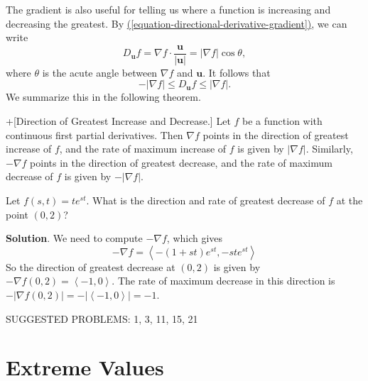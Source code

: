 \documentclass[10pt,]{book}
\theoremstyle{ptxplainnotitle}
\theoremstyle{ptxplaintitle}
\theoremstyle{ptxplainnotitle}
\theoremstyle{ptxplaintitle}
\theoremstyle{ptxplainnotitle}
\theoremstyle{ptxplaintitle}
\theoremstyle{ptxdefinitionnotitle}
\theoremstyle{ptxdefinitiontitle}
\theoremstyle{ptxdefinitionnotitle}
\theoremstyle{ptxdefinitiontitle}
\theoremstyle{ptxdefinitionnotitle}
\theoremstyle{ptxdefinitiontitle}
\theoremstyle{ptxdefinitionnotitle}
\theoremstyle{ptxdefinitiontitle}
\theoremstyle{ptxdefinitionnotitle}
\theoremstyle{ptxdefinitiontitle}
\numberwithin{equation}{section}
\newcommand{\vv}[1]{\mathbf{#1}}
\newcommand{\grad}{\nabla}
\newcommand{\dotprod}[1]{\left\langle #1 \right\rangle}
\begin{document}
\hypertarget{p-1068}{}%
The gradient is also useful for telling us where a function is increasing and decreasing the greatest. By \hyperref[equation-directional-derivative-gradient]{(\ref{equation-directional-derivative-gradient})}, we can write%
\begin{equation*}
D_{\vv{u}}f = \grad f\cdot\frac{\vv{u}}{|\vv{u}|} = |\grad f| \cos\theta,
\end{equation*}
where \(\theta\) is the acute angle between \(\grad f\) and \(\vv{u}\). It follows that%
\begin{equation*}
-|\grad f| \leq D_{\vv{u}}f \leq |\grad f|.
\end{equation*}
We summarize this in the following theorem.%
\begin{theorem}+[{Direction of Greatest Increase and Decrease.}]\label{theorem-direction-of-greatest-increase-and-decrease}
\hypertarget{p-1069}{}%
Let \(f\) be a function with continuous first partial derivatives. Then \(\grad f\) points in the direction of greatest increase of \(f\), and the rate of maximum increase of \(f\) is given by \(|\grad f|\). Similarly, \(-\grad f\) points in the direction of greatest decrease, and the rate of maximum decrease of \(f\) is given by \(-|\grad f|\).%
\end{theorem}
\begin{example}\label{example-finding-the-direction-and-rate-of-maximum-decrease}
\hypertarget{p-1070}{}%
Let \(f(s,t) = te^{st}\). What is the direction and rate of greatest decrease of \(f\) at the point \((0,2)\)?%
\par\smallskip%
\noindent\textbf{Solution}.\hypertarget{solution-168}{}\quad%
\hypertarget{p-1071}{}%
We need to compute \(-\grad f\), which gives%
\begin{equation*}
-\grad f = \dotprod{-(1 + st)e^{st}, -ste^{st}}
\end{equation*}
So the direction of greatest decrease at \((0,2)\) is given by \(-\grad f(0,2) = \dotprod{-1, 0}\). The rate of maximum decrease in this direction is \(-|\grad f(0,2)| = -|\dotprod{-1,0}| = -1\).%
\end{example}
\hypertarget{p-1072}{}%
SUGGESTED PROBLEMS: 1, 3, 11, 15, 21%
\typeout{************************************************}
\typeout{************************************************}
\section[{Extreme Values}]{Extreme Values}\label{section-extreme-values}
\typeout{************************************************}
\typeout{************************************************}
\end{document}
